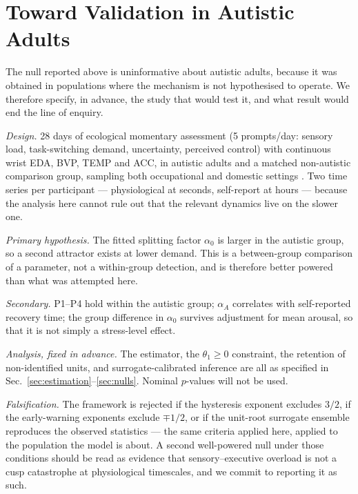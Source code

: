 \documentclass[conference]{IEEEtran}
\begin{document}
\section{Toward Validation in Autistic Adults}
\label{sec:protocol}

The null reported above is uninformative about autistic adults, because it was
obtained in populations where the mechanism is not hypothesised to operate. We
therefore specify, in advance, the study that would test it, and what result
would end the line of enquiry.

\emph{Design.} 28 days of ecological momentary assessment (5 prompts/day:
sensory load, task-switching demand, uncertainty, perceived control) with
continuous wrist EDA, BVP, TEMP and ACC, in autistic adults and a matched
non-autistic comparison group, sampling both occupational and domestic
settings \cite{chen2025ema}. Two time series per participant --- physiological
at seconds, self-report at hours --- because the analysis here cannot rule out
that the relevant dynamics live on the slower one.

\emph{Primary hypothesis.} The fitted splitting factor $\alpha_0$ is larger in
the autistic group, so a second attractor exists at lower demand. This is a
between-group comparison of a parameter, not a within-group detection, and is
therefore better powered than what was attempted here.

\emph{Secondary.} P1--P4 hold within the autistic group; $\alpha_A$ correlates
with self-reported recovery time; the group difference in $\alpha_0$ survives
adjustment for mean arousal, so that it is not simply a stress-level effect.

\emph{Analysis, fixed in advance.} The estimator, the $\theta_1\ge0$
constraint, the retention of non-identified units, and surrogate-calibrated
inference are all as specified in Sec.~\ref{sec:estimation}--\ref{sec:nulls}.
Nominal $p$-values will not be used.

\emph{Falsification.} The framework is rejected if the hysteresis exponent
excludes $3/2$, if the early-warning exponents exclude $\mp1/2$, or if the
unit-root surrogate ensemble reproduces the observed statistics --- the same
criteria applied here, applied to the population the model is about. A second
well-powered null under those conditions should be read as evidence that
sensory--executive overload is not a cusp catastrophe at physiological
timescales, and we commit to reporting it as such.
\end{document}
